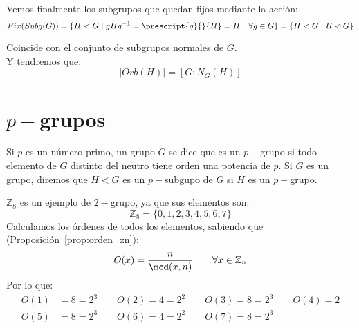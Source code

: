 Vemos finalmente los subgrupos que quedan fijos mediante la acción:
\begin{equation*}
    Fix(Subg(G)) = \{H < G \mid gHg^{-1} = \prescript{g}{}{H} = H \quad \forall g\in G\} = \{H< G \mid H\lhd G\}
\end{equation*}

Coincide con el conjunto de subgrupos normales de $G$.\\

\noindent
Y tendremos que:
\begin{equation*}
    |Orb(H)| = [G:N_G(H)]
\end{equation*}

\section{$p-$grupos}
\begin{definicion}[$p-$grupo]
    Si $p$ es un número primo, un grupo $G$ se dice que es un $p-$grupo si todo elemento de $G$ distinto del neutro tiene orden una potencia de $p$.\newline
    Si $G$ es un grupo, diremos que $H<G$ es un $p-$subgupo de $G$ si $H$ es un $p-$grupo.
\end{definicion}

\begin{ejemplo}
    $\mathbb{Z}_8$ es un ejemplo de $2-$grupo, ya que sus elementos son:
    \begin{equation*}
        \mathbb{Z}_8 = \{0, 1, 2, 3, 4, 5, 6, 7\}
    \end{equation*}
    Calculamos los órdenes de todos los elementos,  sabiendo que (Proposición~\ref{prop:orden_zn}):
    \begin{equation*}
        O(x) = \dfrac{n}{\mcd(x,n)} \qquad \forall x\in \mathbb{Z}_n
    \end{equation*}
    Por lo que:
    \begin{align*}
        O(1) &= 8 = 2^{3} \qquad 
        O(2) = 4 = 2^2 \qquad 
        O(3) = 8 = 2^3 \qquad 
        O(4) = 2 \\
        O(5) &= 8 = 2^3 \qquad 
        O(6) = 4 = 2^2 \qquad 
        O(7) = 8 = 2^3
    \end{align*}
\end{ejemplo}

